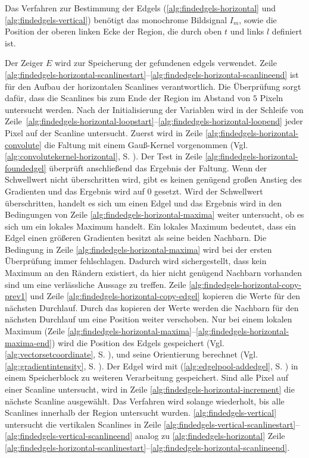 Das Verfahren zur Bestimmung der Edgels (\autoref{alg:findedgels-horizontal} und \autoref{alg:findedgels-vertical})
 benötigt das monochrome Bildsignal $I_m$, sowie die Position der oberen linken Ecke der Region, die durch oben $t$ und
 links $l$ definiert ist.

Der Zeiger $E$ wird zur Speicherung der gefundenen \glspl{edgel} verwendet. Zeile
 \ref{alg:findedgels-horizontal-scanlinestart}--\ref{alg:findedgels-horizontal-scanlineend} ist für den Aufbau der
 horizontalen Scanlines verantwortlich. Die Überprüfung sorgt dafür, dass die Scanlines bis zum Ende der Region im
 Abstand von $5$ Pixeln untersucht werden. Nach der Initialisierung der Variablen wird in der Schleife von
 Zeile~\ref{alg:findedgels-horizontal-loopstart}--\ref{alg:findedgels-horizontal-loopend} jeder Pixel auf der Scanline
 untersucht. Zuerst wird in Zeile \ref{alg:findedgels-horizontal-convolute} die Faltung mit einem Gauß-Kernel
 vorgenommen (Vgl. \autoref{alg:convolutekernel-horizontal}, S. \pageref{alg:convolutekernel-horizontal}). Der Test
 in Zeile \ref{alg:findedgels-horizontal-foundedgel} überprüft anschließend das Ergebnis der Faltung. Wenn der
 Schwellwert nicht überschritten wird, gibt es keinen genügend großen Anstieg des Gradienten und das Ergebnis wird auf
 $0$ gesetzt. Wird der Schwellwert überschritten, handelt es sich um einen Edgel und das Ergebnis wird in den
 Bedingungen von Zeile \ref{alg:findedgels-horizontal-maxima} weiter untersucht, ob es sich um ein lokales Maximum
 handelt. Ein lokales Maximum bedeutet, dass ein Edgel einen größeren Gradienten besitzt als seine beiden Nachbarn. Die
 Bedingung in Zeile \ref{alg:findedgels-horizontal-maxima} wird bei der ersten Überprüfung immer fehlschlagen.
 Dadurch wird sichergestellt, dass kein Maximum an den Rändern existiert, da hier nicht genügend Nachbarn vorhanden sind
 um eine verlässliche Aussage zu treffen. Zeile \ref{alg:findedgels-horizontal-copy-prev1} und
 Zeile \ref{alg:findedgels-horizontal-copy-edgel} kopieren die Werte für den nächsten Durchlauf. Durch das kopieren der
 Werte werden die Nachbarn für den nächsten Durchlauf um eine Position weiter verschoben. Nur bei einem lokalen Maximum
 (Zeile \ref{alg:findedgels-horizontal-maxima}--\ref{alg:findedgels-horizontal-maxima-end}) wird die Position des
 Edgels gespeichert (Vgl. \autoref{alg:vectorsetcoordinate}, S. \pageref{alg:vectorsetcoordinate}), und seine
 Orientierung berechnet (Vgl. \autoref{alg:gradientintensity}, S. \pageref{alg:gradientintensity}). Der Edgel wird mit
  (\autoref{alg:edgelpool-addedgel}, S. \pageref{alg:edgelpool-addedgel}) in einem Speicherblock zu
 weiteren Verarbeitung gespeichert. Sind alle Pixel auf einer Scanline untersucht, wird in Zeile
 \ref{alg:findedgels-horizontal-increment} die nächste Scanline ausgewählt. Das Verfahren wird solange wiederholt, bis
 alle Scanlines innerhalb der Region untersucht wurden. \autoref{alg:findedgels-vertical} untersucht die vertikalen
 Scanlines in Zeile \ref{alg:findedgels-vertical-scanlinestart}--\ref{alg:findedgels-vertical-scanlineend} analog zu
 \autoref{alg:findedgels-horizontal} Zeile
 \ref{alg:findedgels-horizontal-scanlinestart}--\ref{alg:findedgels-horizontal-scanlineend}.


